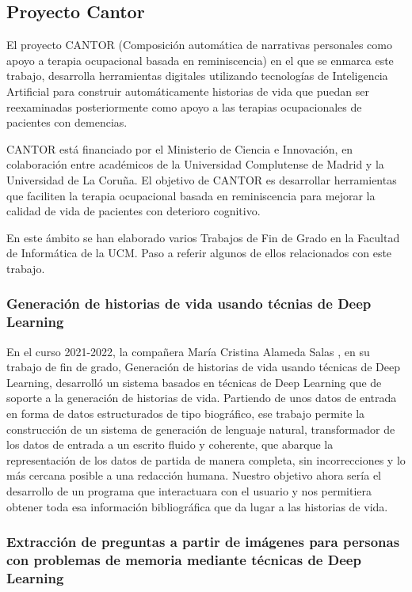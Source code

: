 \subsection{Proyecto Cantor}
El proyecto CANTOR (Composición automática de narrativas personales como apoyo a terapia ocupacional basada en reminiscencia) en el que se enmarca este trabajo, desarrolla herramientas digitales utilizando tecnologías de Inteligencia Artificial para construir automáticamente historias de vida que puedan ser reexaminadas posteriormente como apoyo a las terapias ocupacionales de pacientes con demencias.

CANTOR está financiado por el Ministerio de Ciencia e Innovación, en colaboración entre académicos de la Universidad Complutense de Madrid y la Universidad de La Coruña. El objetivo de CANTOR es desarrollar herramientas que faciliten la terapia ocupacional basada en reminiscencia para mejorar la calidad de vida de pacientes con deterioro cognitivo.

En este ámbito se han elaborado varios Trabajos de Fin de Grado en la Facultad de Informática de la UCM. Paso a referir algunos de ellos relacionados con este trabajo. 

\subsubsection{Generación de historias de vida usando técnias de Deep Learning}
\label{sec:trabajocristina}
En el curso 2021-2022, la compañera María Cristina Alameda Salas \citep{cristinaalameda}, en su trabajo de fin de grado, Generación de historias de vida
usando técnicas de Deep Learning, desarrolló un sistema basados en técnicas
de Deep Learning que de soporte a la generación de historias de vida. Partiendo de unos datos de entrada en forma de datos estructurados de tipo biográfico, ese trabajo permite la construcción de un sistema de generación de lenguaje natural, transformador de los datos de entrada a un escrito fluido y coherente, que abarque la representación de los datos de partida de manera completa, sin incorrecciones y lo más cercana posible a una redacción humana. Nuestro objetivo ahora sería el desarrollo de un programa que interactuara con el usuario y nos permitiera obtener toda esa información bibliográfica que da lugar a las historias de vida. 
\subsubsection{Extracción de preguntas a partir de imágenes para personas con problemas de memoria mediante técnicas de Deep Learning}

